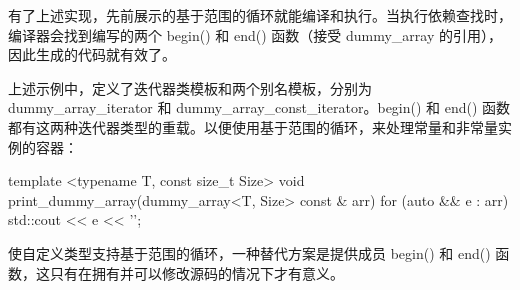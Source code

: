 
有了上述实现，先前展示的基于范围的循环就能编译和执行。当执行依赖查找时，编译器会找到编写的两个 begin() 和 end() 函数（接受 dummy\_array 的引用），因此生成的代码就有效了。

上述示例中，定义了迭代器类模板和两个别名模板，分别为 dummy\_array\_iterator 和 dummy\_array\_const\_iterator。begin() 和 end() 函数都有这两种迭代器类型的重载。以便使用基于范围的循环，来处理常量和非常量实例的容器：

\begin{cpp}
template <typename T, const size_t Size>
void print_dummy_array(dummy_array<T, Size> const & arr)
{
    for (auto && e : arr)
    {
        std::cout << e << '\n';
    }
}
\end{cpp}

使自定义类型支持基于范围的循环，一种替代方案是提供成员 begin() 和 end() 函数，这只有在拥有并可以修改源码的情况下才有意义。













